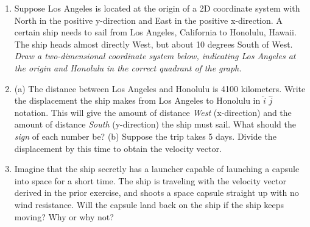 \documentclass{article}
\begin{document}
\begin{enumerate}
\item Suppose Los Angeles is located at the origin of a 2D coordinate system with North in the positive y-direction and East in the positive x-direction.  A certain ship needs to sail from Los Angeles, California to Honolulu, Hawaii.  The ship heads almost directly West, but about 10 degrees South of West.  \textit{Draw a two-dimensional coordinate system below, indicating Los Angeles at the origin and Honolulu in the correct quadrant of the graph.} \\ \vspace{3cm}
\item (a) The distance between Los Angeles and Honolulu is 4100 kilometers.  Write the displacement the ship makes from Los Angeles to Honolulu in $\hat{i}$ $\hat{j}$ notation.  This will give the amount of distance \textit{West} (x-direction) and the amount of distance \textit{South} (y-direction) the ship must sail.  What should the \textit{sign} of each number be?  (b) Suppose the trip takes 5 days.  Divide the displacement by this time to obtain the velocity vector.  \\ \vspace{3cm}
\item Imagine that the ship secretly has a launcher capable of launching a capsule into space for a short time.  The ship is traveling with the velocity vector derived in the prior exercise, and shoots a space capsule straight up with no wind resistance.  Will the capsule land back on the ship if the ship keeps moving?  Why or why not?
\end{enumerate}
\end{document}
